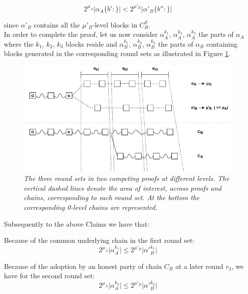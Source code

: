 \begin{equation}
2^{\mu_A} \vert \alpha_A\{b':\} \vert < 2^{\mu'_B} \vert \alpha'_B\{b'':\} \vert
\end{equation} 

since $\alpha'_B$ contains all the $\mu'_B$-level blocks in $C_B^S$. \\


In order to complete the proof, let us now consider $\alpha_A^{k_1}$,
$\alpha_A^{k_2}$, $\alpha_A^{k_3}$ the parts of $\alpha_A$ where the
$k_1$, $k_2$, $k_3$ blocks reside and $\alpha_B^{k_1}$, $\alpha_B^{k_2}$,
$\alpha_B^{k_3}$ the parts of $\alpha_B$ containing blocks generated in the
corresponding round sets as illustrated in Figure \ref{fig:claim3}.

\begin{figure}[h]
	\begin{center}
		\includegraphics[scale=0.5]{figures/claim3.png}
	\end{center}
	\caption{\textit{The three round sets in two competing proofs at different levels.
	The vertical dashed lines denote the area of interest, across proofs and chains,
	corresponding to each round set. At the bottom the corresponding 0-level chains
	are represented.}}
	\label{fig:claim3}
\end{figure}

Subsequently to the above Claims we have that:

Because of the common underlying chain in the first round set:
\begin{equation} \label{eq_round_set_1}
2^{\mu_A} \vert \alpha_A^{k_1} \vert \leq 2^{\mu'_B} \vert \alpha'{_B^{k_1}} \vert
\end{equation}

Because of the adoption by an honest party of chain $C_B$ at a later round $r_3$, 
we have for the second round set:
\begin{equation} \label{eq_round_set_2}
2^{\mu_A} \vert \alpha_A^{k_2} \vert \leq 2^{\mu'_B} \vert \alpha'{_B^{k_2}} \vert
\end{equation}

